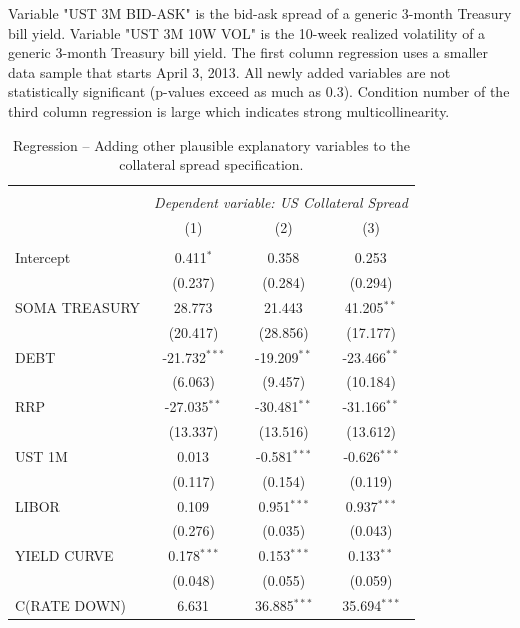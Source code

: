 \documentclass[11pt,a4paper,english,oneside]{article}
\begin{document}
\begin{appendices}
\begin{table}[!htbp] \centering
\caption{Regression -- Adding other plausible explanatory variables to the collateral spread specification.}
\vspace{-10pt}
\begin{flushleft}
Variable "UST 3M BID-ASK" is the bid-ask spread of a generic 3-month Treasury bill yield. Variable "UST 3M 10W VOL" is the 10-week realized volatility of a generic 3-month Treasury bill yield. The first column regression uses a smaller data sample that starts April 3, 2013. All newly added variables are not statistically significant (p-values exceed as much as 0.3). Condition number of the third column regression is large which indicates strong multicollinearity.
\end{flushleft}
\begin{tabular}{@{\extracolsep{5pt}}lccc}
\\[-1.8ex]\hline
\hline \\[-1.8ex]
& \multicolumn{3}{c}{\textit{Dependent variable: US Collateral Spread}} \
\cr \cline{3-4}
\\[-1.8ex] & (1) & (2) & (3) \\
\hline \\[-1.8ex]
 Intercept & 0.411$^{*}$ & 0.358$^{}$ & 0.253$^{}$ \\
  & (0.237) & (0.284) & (0.294) \\
 SOMA TREASURY & 28.773$^{}$ & 21.443$^{}$ & 41.205$^{**}$ \\
  & (20.417) & (28.856) & (17.177) \\
 DEBT & -21.732$^{***}$ & -19.209$^{**}$ & -23.466$^{**}$ \\
  & (6.063) & (9.457) & (10.184) \\
 RRP & -27.035$^{**}$ & -30.481$^{**}$ & -31.166$^{**}$ \\
  & (13.337) & (13.516) & (13.612) \\
 UST 1M & 0.013$^{}$ & -0.581$^{***}$ & -0.626$^{***}$ \\
  & (0.117) & (0.154) & (0.119) \\
 LIBOR & 0.109$^{}$ & 0.951$^{***}$ & 0.937$^{***}$ \\
  & (0.276) & (0.035) & (0.043) \\
 YIELD CURVE & 0.178$^{***}$ & 0.153$^{***}$ & 0.133$^{**}$ \\
  & (0.048) & (0.055) & (0.059) \\
 C(RATE DOWN) & 6.631$^{}$ & 36.885$^{***}$ & 35.694$^{***}$ \\

\end{tabular}
\end{table}
\end{appendices}
\end{document}
